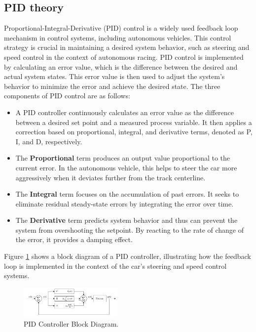 \documentclass[conference]{IEEEtran}
\begin{document}
\subsection{PID theory}

Proportional-Integral-Derivative (PID) control is a widely used feedback loop mechanism in control systems, including autonomous vehicles. This control strategy is crucial in maintaining a desired system behavior, such as steering and speed control in the context of autonomous racing. PID control is implemented by calculating an error value, which is the difference between the desired and actual system states. This error value is then used to adjust the system's behavior to minimize the error and achieve the desired state. The three components of PID control are as follows:

\begin{itemize}
	\item A PID controller continuously calculates an error value as the difference between a desired set point and a measured process variable. It then applies a correction based on proportional, integral, and derivative terms, denoted as P, I, and D, respectively.
	\item The \textbf{Proportional} term produces an output value proportional to the current error. In the autonomous vehicle, this helps to steer the car more aggressively when it deviates further from the track centerline.
	\item The \textbf{Integral} term focuses on the accumulation of past errors. It seeks to eliminate residual steady-state errors by integrating the error over time.
	\item The \textbf{Derivative} term predicts system behavior and thus can prevent the system from overshooting the setpoint. By reacting to the rate of change of the error, it provides a damping effect.
\end{itemize}

Figure \ref{fig:PID} shows a block diagram of a PID controller, illustrating how the feedback loop is implemented in the context of the car's steering and speed control systems.

\begin{figure}[htbp]
	\centerline{\includegraphics[width=0.45\textwidth]{images/pid.png}}
	\caption{PID Controller Block Diagram.}
	\label{fig:PID}
\end{figure}
\end{document}
